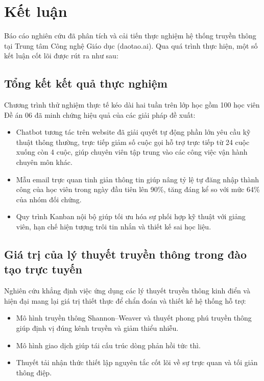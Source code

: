 \section{Kết luận}

Báo cáo nghiên cứu đã phân tích và cải tiến thực nghiệm hệ thống truyền thông tại Trung tâm Công nghệ Giáo dục (daotao.ai). Qua quá trình thực hiện, một số kết luận cốt lõi được rút ra như sau:

\subsection{Tổng kết kết quả thực nghiệm}

Chương trình thử nghiệm thực tế kéo dài hai tuần trên lớp học gồm 100 học viên Đề án 06 đã minh chứng hiệu quả của các giải pháp đề xuất:
\begin{itemize}
    \item Chatbot tương tác trên website đã giải quyết tự động phần lớn yêu cầu kỹ thuật thông thường, trực tiếp giảm số cuộc gọi hỗ trợ trực tiếp từ 24 cuộc xuống còn 4 cuộc, giúp chuyên viên tập trung vào các công việc vận hành chuyên môn khác.
    \item Mẫu email trực quan tinh giản thông tin giúp nâng tỷ lệ tự đăng nhập thành công của học viên trong ngày đầu tiên lên 90\%, tăng đáng kể so với mức 64\% của nhóm đối chứng.
    \item Quy trình Kanban nội bộ giúp tối ưu hóa sự phối hợp kỹ thuật với giảng viên, hạn chế hiện tượng trôi tin nhắn và thiết kế sai học liệu.
\end{itemize}

\subsection{Giá trị của lý thuyết truyền thông trong đào tạo trực tuyến}

Nghiên cứu khẳng định việc ứng dụng các lý thuyết truyền thông kinh điển và hiện đại mang lại giá trị thiết thực để chẩn đoán và thiết kế hệ thống hỗ trợ:
\begin{itemize}
    \item Mô hình truyền thông Shannon–Weaver \parencite{shannon1949} và thuyết phong phú truyền thông \parencite{daft1986} giúp định vị đúng kênh truyền và giảm thiểu nhiễu.
    \item Mô hình giao dịch \parencite{barnlund2008} giúp tái cấu trúc dòng phản hồi tức thì.
    \item Thuyết tải nhận thức \parencite{sweller1988} thiết lập nguyên tắc cốt lõi về sự trực quan và tối giản thông điệp.
\end{itemize}

